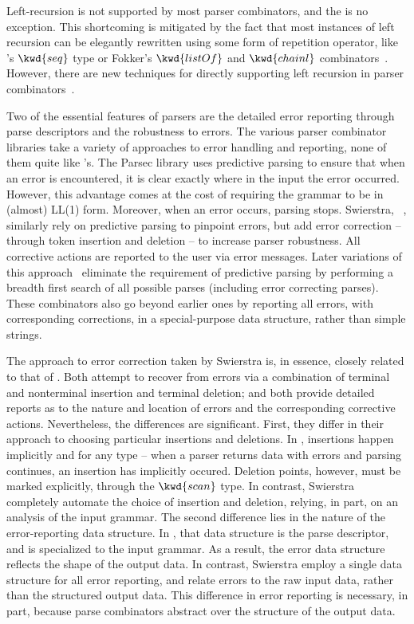 Left-recursion is not supported by most parser combinators, and the \ddc{} is no exception. This shortcoming is mitigated by the fact that most instances of left recursion can be elegantly rewritten using some form of repetition operator, like \ddc{}'s $\kwd{seq}$ type or
Fokker's $\kwd{listOf}$ and $\kwd{chainl}$ combinators~\cite{fokker:functional-parsers}. However, there are new techniques for directly supporting left recursion in parser combinators~\cite{frost+:padl-pcombs}.

Two of the essential features of \ddc{} parsers are the detailed
error reporting through parse descriptors and the robustness to
errors. The various parser combinator libraries take a variety of
approaches to error handling and reporting, none of them quite like
\ddc{}'s. The Parsec library uses predictive parsing to ensure that
when an error is encountered, it is clear exactly where in the input
the error occurred. However, this advantage comes at the cost of
requiring the grammar to be in (almost) LL(1) form. Moreover, when an
error occurs, parsing stops. Swierstra,
\etal{}~\cite{swierstra+:deterministic-error-correcting}, similarly
rely on predictive parsing to pinpoint errors, but add error
correction -- through token insertion and deletion -- to increase
parser robustness. All corrective actions are reported to the user via
error messages. Later variations of this
approach~\cite{swierstra+:fast-error-correcting,swierstra:toys-parsing}
eliminate the requirement of predictive parsing by performing a
breadth first search of all possible parses (including error
correcting parses). These combinators also go beyond earlier ones by
reporting all errors, with corresponding corrections, in a
special-purpose data structure, rather than simple strings.

The approach to error correction taken by Swierstra \etal{} is, in essence, closely related to that of \ddc{}. Both attempt to recover from errors via a combination of terminal and nonterminal insertion and terminal deletion; and both provide detailed reports as to the nature and location of errors and the corresponding corrective actions. Nevertheless, the differences are significant. First, they differ in their approach to choosing particular insertions and deletions. In \ddc{}, insertions happen implicitly and for any type -- when a parser returns data with errors and parsing continues, an insertion has implicitly occured. Deletion points, however, must be marked explicitly, through the $\kwd{scan}$ type. In contrast, Swierstra \etal{} completely automate the choice of insertion and deletion, relying, in part, on an analysis of the input grammar. The second difference lies in the nature of the error-reporting data structure. In \ddc{}, that data structure is the parse descriptor, and is specialized to the input grammar. As a result, the error data structure reflects the shape of the output data. In contrast, Swierstra \etal{} employ a single data structure for all error reporting, and relate errors to the raw input data, rather than the structured output data. This difference in error reporting is necessary, in part, because parse combinators abstract over the structure of the output data. 

